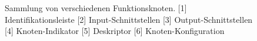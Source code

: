 \begin{figure}[h]
    \caption{Sammlung von verschiedenen Funktionsknoten. [1] Identifikationsleiste [2] Input-Schnittstellen [3] Output-Schnittstellen [4] Knoten-Indikator [5] Deskriptor [6] Knoten-Konfiguration}
    \label{fig:actornodes}
\end{figure}